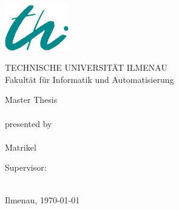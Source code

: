 \begin{titlepage}

    \begin{center}
        \includegraphics[height=2cm]{pics/logo-thi.jpg}
        \vspace{1cm}

        TECHNISCHE UNIVERSITÄT ILMENAU\\
        Fakultät für Informatik und Automatisierung

        \vspace{4cm}

        {\large  Master Thesis} \\
        \vspace{1cm}
        {\LARGE \normalfont \bfseries \sathema} \\
        \vspace{1cm}
        {presented by} \\
        \vspace{0.5cm}
        {\large \saauthor}\\
        {Matrikel \matrikel}
        \vspace{2cm}

        Supervisor: \\
        \vspace{0.5cm}
        \saprof \\
        \saproff

        \vspace{1cm}

        Ilmenau, \today
    \end{center}

\end{titlepage}
